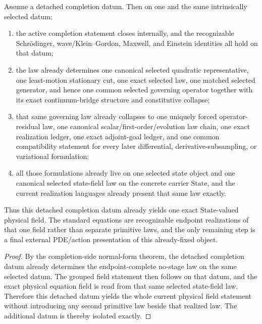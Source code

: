 \begin{theorem}
\label{thm:endpoint-complete-no-stage-law-already-carries-the-strongest-current-analytic-flagship-surface}
Assume a detached completion datum.
Then on one and the same intrinsically selected datum:
\begin{enumerate}
\item the active completion statement closes internally, and the
      recognizable Schr\"odinger, wave/Klein--Gordon, Maxwell, and Einstein
      identities all hold on that datum;
\item the law already determines one canonical selected quadratic
      representative, one least-motion stationary cut, one exact selected law,
      one matched selected generator, and hence one common
      selected governing operator together with its exact continuum-bridge
      structure and constitutive collapse;
\item that same governing law already collapses to one uniquely forced
      operator-residual law, one canonical scalar/first-order/evolution
      law chain, one exact realization ledger, one exact
      adjoint-goal ledger, and one common compatibility statement for every later
      differential, derivative-subsampling, or variational formulation;
\item all those formulations already live on one selected state object and one
      canonical selected state-field law on the concrete carrier
      \(\mathrm{State}\), and the current realization languages
      already present that same law exactly.
\end{enumerate}
Thus this detached completion datum already yields one exact \(\mathrm{State}\)-valued
physical field. The standard equations are recognizable endpoint realizations of that
one field rather than separate primitive laws, and the only remaining step is
a final external PDE/action presentation of this already-fixed object.
\end{theorem}

\begin{proof}
By the completion-side normal-form theorem, the detached completion datum
already determines the endpoint-complete no-stage law on the same selected
datum. The grouped field statement then follows on that datum, and
the exact physical equation field is read from that same selected state-field
law. Therefore this detached datum yields the whole current physical
field statement without introducing any second primitive law beside that
realized law. The additional datum is thereby isolated exactly.
\end{proof}

